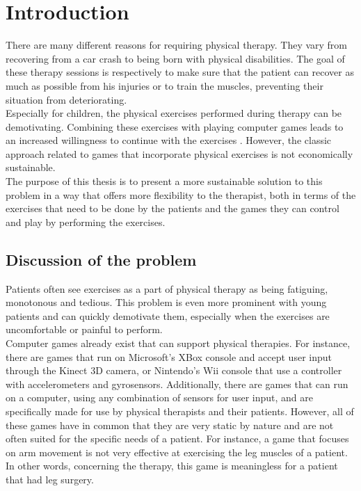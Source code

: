 \chapter{Introduction}

There are many different reasons for requiring physical therapy. They vary from recovering from a car crash to being born with physical disabilities. The goal of these therapy sessions is respectively to make sure that the patient can recover as much as possible from his injuries or to train the muscles, preventing their situation from deteriorating.\\

Especially for children, the physical exercises performed during therapy can be demotivating. Combining these exercises with playing computer games leads to an increased willingness to continue with the exercises \cite{Brauner2013}. However, the classic approach related to games that incorporate physical exercises is not economically sustainable.\\

The purpose of this thesis is to present a more sustainable solution to this problem in a way that offers more flexibility to the therapist, both in terms of the exercises that need to be done by the patients and the games they can control and play by performing the exercises.


\section{Discussion of the problem}

Patients often see exercises as a part of physical therapy as being fatiguing, monotonous and tedious. This problem is even more prominent with young patients and can quickly demotivate them, especially when the exercises are uncomfortable or painful to perform.\\

Computer games already exist that can support physical therapies. For instance, there are games that run on Microsoft's XBox console and accept user input through the Kinect 3D camera, or Nintendo's Wii console that use a controller with accelerometers and gyrosensors. Additionally, there are games that can run on a computer, using any combination of sensors for user input, and are specifically made for use by physical therapists and their patients. However, all of these games have in common that they are very static by nature and are not often suited for the specific needs of a patient. For instance, a game that focuses on arm movement is not very effective at exercising the leg muscles of a patient. In other words, concerning the therapy, this game is meaningless for a patient that had leg surgery.\\

